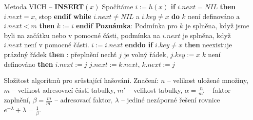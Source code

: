 \documentclass[a4paper,12pt]{article}
\begin{document}
Metoda VICH -- {\bf INSERT$(x)$}\newline 
Spočítáme $i:=h(x)$\newline 
{\bf if} $i.next=NIL$ {\bf then} $i.next=x$, stop {\bf endif\newline 
while} $i.next\ne NIL$ a $i.key\ne x$ {\bf do}\newline 
\phantom{---}{\bf if} $k$ není definováno a $i.next<m$ {\bf then} $k:=i$ {\bf endif\newline 
Poznámka}: Podmínka pro $k$ je splněna, když jsme byli na 
začátku nebo v pomocné části, podmínka na $i.next$ je 
splněna, když $i.next$ není v pomocné části.\newline 
\phantom{---}$i:=i.next$\newline 
{\bf enddo\newline 
if} $i.key\ne x$ {\bf then}\newline 
\phantom{---}{\bf if} neexistuje prázdný řádek {\bf then}\newline 
\phantom{------}{\bf Výstup}: přeplnění\newline 
\phantom{---}{\bf else}\newline 
\phantom{------}nech\v t $j$ je volný řádek, $j.key:=x$\newline 
\phantom{------}{\bf if} $k$ není definováno {\bf then}\newline 
\phantom{---------}$i.next:=j$\newline 
\phantom{------}{\bf else}\newline 
\phantom{---------}$j.next:=k.next$, $k.next:=j$\newline 
\phantom{------}{\bf endif}\newline 
\phantom{---}{\bf endif\newline 
endif}
\bigskip

Složitost algoritmů pro srůstající hašování.\newline 
Značení: $n$ -- velikost uložené množiny,\newline 
$m$ -- velikost adresovací části tabulky,\newline 
$m'$ -- velikost tabulky,\newline 
$\alpha =\frac n{m'}$ -- faktor zaplnění,\newline 
$\beta =\frac m{m'}$ -- adresovací faktor,\newline 
$\lambda$ -- jediné nezáporné řešení rovnice $e^{
-\lambda}+\lambda =\frac 1{\beta}$.
\end{document}
